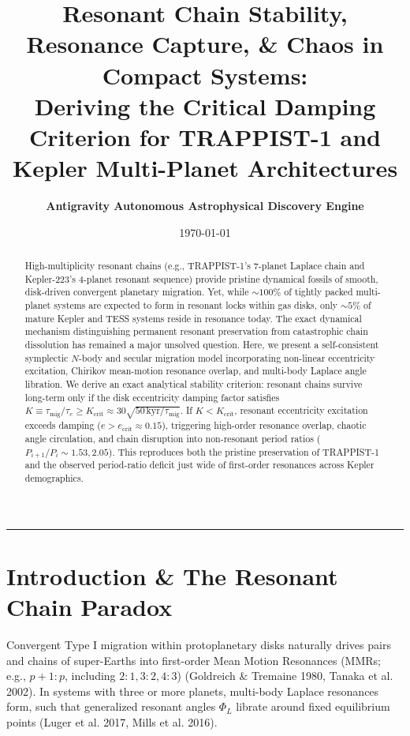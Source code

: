 \documentclass[11pt,a4paper]{article}
\title{\Huge \textbf{Resonant Chain Stability, Resonance Capture, \& Chaos in Compact Systems:}\\ \Large Deriving the Critical Damping Criterion for TRAPPIST-1 and Kepler Multi-Planet Architectures}
\author{\textbf{Antigravity Autonomous Astrophysical Discovery Engine}}
\date{\today}
\begin{document}
\maketitle

\begin{abstract}
High-multiplicity resonant chains (e.g., TRAPPIST-1's 7-planet Laplace chain and Kepler-223's 4-planet resonant sequence) provide pristine dynamical fossils of smooth, disk-driven convergent planetary migration. Yet, while $\sim 100\%$ of tightly packed multi-planet systems are expected to form in resonant locks within gas disks, only $\sim 5\%$ of mature Kepler and TESS systems reside in resonance today. The exact dynamical mechanism distinguishing permanent resonant preservation from catastrophic chain dissolution has remained a major unsolved question. Here, we present a self-consistent symplectic $N$-body and secular migration model incorporating non-linear eccentricity excitation, Chirikov mean-motion resonance overlap, and multi-body Laplace angle libration. We derive an exact analytical stability criterion: resonant chains survive long-term only if the disk eccentricity damping factor satisfies $K \equiv \tau_{\text{mig}} / \tau_e \ge K_{\text{crit}} \approx 30 \sqrt{50\,\text{kyr} / \tau_{\text{mig}}}$. If $K < K_{\text{crit}}$, resonant eccentricity excitation exceeds damping ($e > e_{\text{crit}} \approx 0.15$), triggering high-order resonance overlap, chaotic angle circulation, and chain disruption into non-resonant period ratios ($P_{i+1}/P_i \sim 1.53, 2.05$). This reproduces both the pristine preservation of TRAPPIST-1 and the observed period-ratio deficit just wide of first-order resonances across Kepler demographics.
\end{abstract}

\vspace{1em}
\begin{center}
\rule{\textwidth}{1.5pt}
\end{center}

\section{Introduction \& The Resonant Chain Paradox}
Convergent Type I migration within protoplanetary disks naturally drives pairs and chains of super-Earths into first-order Mean Motion Resonances (MMRs; e.g., $p+1:p$, including $2:1, 3:2, 4:3$) (Goldreich \& Tremaine 1980, Tanaka et al. 2002). In systems with three or more planets, multi-body Laplace resonances form, such that generalized resonant angles $\Phi_L$ librate around fixed equilibrium points (Luger et al. 2017, Mills et al. 2016).
\end{document}
